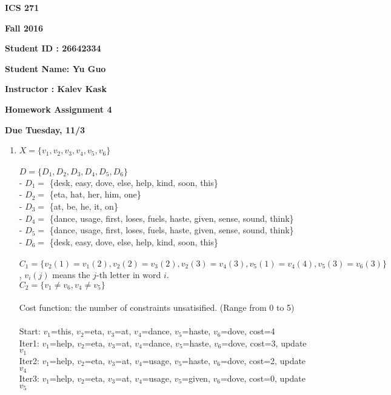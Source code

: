 \documentclass{article}
\begin{document}
{\bf ICS 271}

{\bf Fall 2016}

{\bf Student ID : 26642334}

{\bf Student Name: Yu Guo}

{\bf Instructor : Kalev Kask}

{\bf Homework Assignment 4}

{\bf Due Tuesday, 11/3}




\begin{enumerate}

\item

$X = \{v_1,v_2,v_3,v_4,v_5,v_6\}$ \\ \\
$D = \{D_1,D_2,D_3,D_4,D_5,D_6\}$ \\
- $D_1 = $ \{desk, easy, dove, else, help, kind, soon, this\} \\
- $D_2 = $ \{eta, hat, her, him, one\} \\
- $D_3 = $ \{at, be, he, it, on\} \\
- $D_4 = $ \{dance, usage, first, loses, fuels, haste, given, sense, sound, think\} \\
- $D_5 = $ \{dance, usage, first, loses, fuels, haste, given, sense, sound, think\} \\
- $D_6 = $ \{desk, easy, dove, else, help, kind, soon, this\} \\ \\
$C_1 = \{v_2(1)=v_1(2), v_2(2)=v_3(2), v_2(3)=v_4(3), v_5(1)=v_4(4), v_5(3)=v_6(3)\}$, $v_i(j)$ means the $j$-th letter in word $i$. \\
$C_2 = \{v_1 \neq v_6, v_4 \neq v_5\}$ \\ \\
Cost function: the number of constraints unsatisified. (Range from 0 to 5) \\ \\
Start: $v_1$=this, $v_2$=eta, $v_3$=at, $v_4$=dance, $v_5$=haste, $v_6$=dove, cost=4\\
Iter1: $v_1$=help, $v_2$=eta, $v_3$=at, $v_4$=dance, $v_5$=haste, $v_6$=dove, cost=3, update $v_1$\\
Iter2: $v_1$=help, $v_2$=eta, $v_3$=at, $v_4$=usage, $v_5$=haste, $v_6$=dove, cost=2, update $v_4$\\
Iter3: $v_1$=help, $v_2$=eta, $v_3$=at, $v_4$=usage, $v_5$=given, $v_6$=dove, cost=0, update $v_5$\\



\end{enumerate}
\end{document}
